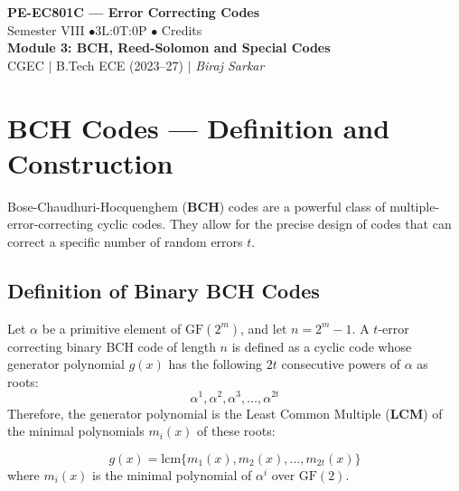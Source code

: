 \documentclass[12pt,a4paper]{article}
\begin{document}

\begin{center}
  {\LARGE\bfseries\color{myred} PE-EC801C --- Error Correcting Codes}\\[5pt]
  {\normalsize\color{mydark} Semester VIII \quad$\bullet$\quad 3L:0T:0P \quad$\bullet$ Credits}\\[3pt]
  {\normalsize\color{myteal}\textbf{Module 3: BCH, Reed-Solomon and Special Codes}}\\[3pt]
  {\small\color{mydark} CGEC \;$|$\; B.Tech ECE (2023--27) \;$|$\; \textit{Biraj Sarkar}}
\end{center}
\vspace{2pt}
\noindent{\color{myred}\rule{\linewidth}{1.5pt}}
\vspace{2pt}

\hypersetup{linkcolor=mydark}
\tableofcontents
\hypersetup{linkcolor=myteal}
\newpage

\section{BCH Codes --- Definition and Construction}

Bose-Chaudhuri-Hocquenghem (\textbf{BCH}) codes are a powerful class of multiple-error-correcting cyclic codes. They allow for the precise design of codes that can correct a specific number of random errors $t$.

\subsection{Definition of Binary BCH Codes}
Let $\alpha$ be a primitive element of $\text{GF}(2^m)$, and let $n = 2^m-1$. A $t$-error correcting binary BCH code of length $n$ is defined as a cyclic code whose generator polynomial $g(x)$ has the following $2t$ consecutive powers of $\alpha$ as roots:
\[ \alpha^1, \alpha^2, \alpha^3, \dots, \alpha^{2t} \]
Therefore, the generator polynomial is the Least Common Multiple (\textbf{LCM}) of the minimal polynomials $m_i(x)$ of these roots:
\begin{tcolorbox}[formulabox, title={\textbf{BCH Generator Polynomial}}]
\[ g(x) = \text{lcm} \{ m_1(x), m_2(x), \dots, m_{2t}(x) \} \]
where $m_i(x)$ is the minimal polynomial of $\alpha^i$ over $\text{GF}(2)$.
\end{tcolorbox}
\end{document}
